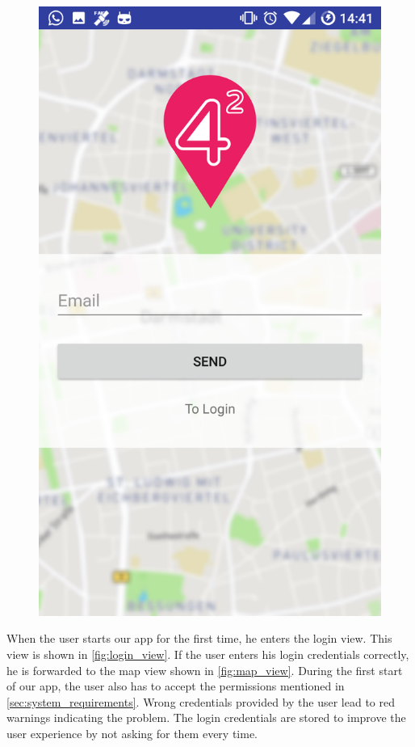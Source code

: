 \documentclass[11pt, accentcolor=tud1c]{tudreport}
\begin{document}
\begin{figure}[h]
\begin{minipage}{.3\textwidth}
  \includegraphics[width=.8\linewidth]{./res/forgotPW.png}
  \label{fig:forgot_pw_view}
\end{minipage}%
\end{figure}

When the user starts our app for the first time, he enters the login view. This view is shown in \autoref{fig:login_view}. If the user enters his login credentials correctly, he is forwarded to the map view shown in \autoref{fig:map_view}. During the first start of our app, the user also has to accept the permissions mentioned in \autoref{sec:system_requirements}. Wrong credentials provided by the user lead to red warnings indicating the problem. The login credentials are stored to improve the user experience by not asking for them every time.
\end{document}
